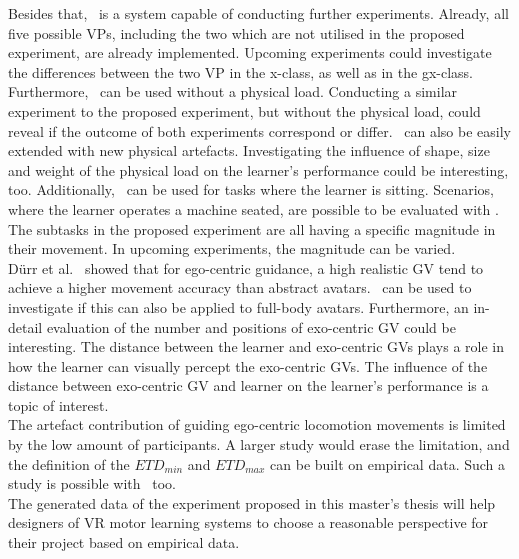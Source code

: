 Besides that, \exgo\ is a system capable of conducting further experiments. Already, all five possible VPs, including the two which are not utilised in the proposed experiment, are already implemented. Upcoming experiments could investigate the differences between the two VP in the x-class, as well as in the gx-class.\\
Furthermore, \exgo\ can be used without a physical load. Conducting a similar experiment to the proposed experiment, but without the physical load, could reveal if the outcome of both experiments correspond or differ. \exgo\ can also be easily extended with new physical artefacts. Investigating the influence of shape, size and weight of the physical load on the learner's performance could be interesting, too. Additionally, \exgo\ can be used for tasks where the learner is sitting. Scenarios, where the learner operates a machine seated, are possible to be evaluated with \exgo.\\
The subtasks in the proposed experiment are all having a specific magnitude in their movement. In upcoming experiments, the magnitude can be varied.\\
Dürr et al.~\cite{max} showed that for ego-centric guidance, a high realistic GV tend to achieve a higher movement accuracy than abstract avatars. \exgo\ can be used to investigate if this can also be applied to full-body avatars. Furthermore, an in-detail evaluation of the number and positions of exo-centric GV could be interesting. The distance between the learner and exo-centric GVs plays a role in how the learner can visually percept the exo-centric GVs. The influence of the distance between exo-centric GV and learner on the learner's performance is a topic of interest.\\
The artefact contribution of guiding ego-centric locomotion movements is limited by the low amount of participants. A larger study would erase the limitation, and the definition of the $ETD_{min}$ and $ETD_{max}$ can be built on empirical data. Such a study is possible with \exgo\, too.\\

The generated data of the experiment proposed in this master's thesis will help designers of VR motor learning systems to choose a reasonable perspective for their project based on empirical data.
